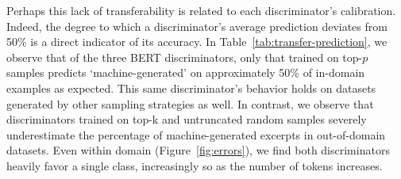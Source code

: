 Perhaps this lack of transferability is related to each discriminator's calibration.
Indeed, the degree to which a discriminator's average prediction deviates from 50\% is a direct indicator of its accuracy. 
In Table~\ref{tab:transfer-prediction}, we observe that of the three BERT discriminators, only that trained on top-$p$ samples predicts `machine-generated' on approximately 50\% of in-domain examples as expected. 
This same discriminator's behavior holds on datasets generated by other sampling strategies as well. 
In contrast, we observe that discriminators trained on top-k and untruncated random samples severely underestimate the percentage of machine-generated excerpts in out-of-domain datasets.
Even within domain (Figure~\ref{fig:errors}), we find both discriminators heavily favor a single class, increasingly so as the number of tokens increases.


